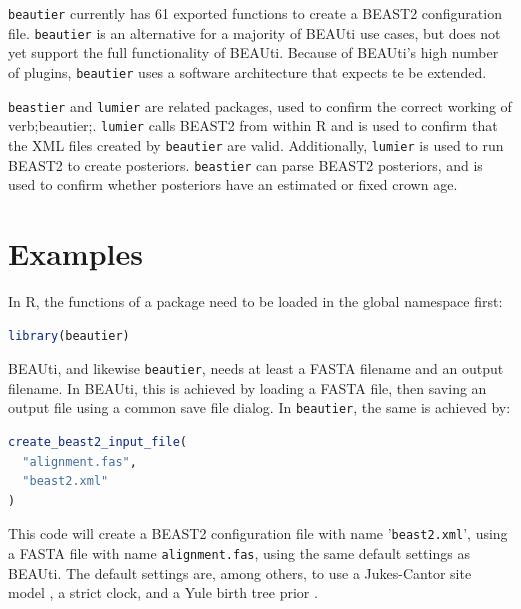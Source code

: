 \documentclass{article}
\begin{document}
\verb;beautier; currently has 61 exported functions to create a BEAST2 configuration file. 
\verb;beautier; is an alternative for a majority of BEAUti use cases, 
but does not yet support the full functionality of BEAUti. 
Because of BEAUti's high number of plugins, 
\verb;beautier; uses a software architecture that expects te be extended.

\verb;beastier; \cite{beastier} and \verb;lumier; \cite{lumier} are related packages, used to confirm the correct working of verb;beautier;.
\verb;lumier; calls BEAST2 from within R and is used to confirm that the XML files created by \verb;beautier; are valid. 
Additionally, \verb;lumier; is used to run BEAST2 to create posteriors. 
\verb;beastier; can parse BEAST2 posteriors, and is used to confirm whether posteriors have an estimated or fixed crown age.

\section{Examples}

In R, the functions of a package need to be loaded in the global namespace first:

\begin{lstlisting}[language=R, caption=Loading, label=lst:loading_beautier, floatplacement=H]
library(beautier)
\end{lstlisting}

BEAUti, and likewise \verb;beautier;, needs at least a FASTA filename
and an output filename. In BEAUti, this is achieved by loading a FASTA file, 
then saving an output file using a common
save file dialog. In \verb;beautier;, the same is achieved by:

\begin{lstlisting}[language=R, caption=Simplest example, label=lst:simplest_example, floatplacement=H]
create_beast2_input_file(
  "alignment.fas",
  "beast2.xml"
)
\end{lstlisting}

This code will create a BEAST2 configuration file with name '\verb;beast2.xml;',
using a FASTA file with name \verb;alignment.fas;, using the same default settings as BEAUti.
The default settings are, among others, to use a Jukes-Cantor site model \cite{cantor1969mammalian}, 
a strict clock, and a Yule birth tree prior \cite{yule}. 
\end{document}

